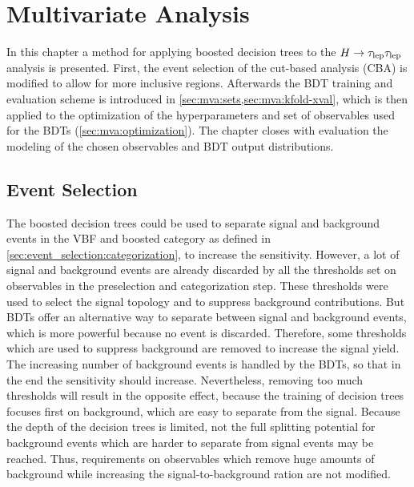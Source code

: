 \chapter{Multivariate Analysis}\label{cha:mva}

In this chapter a method for applying boosted decision trees to the $H \to \tau_\text{lep} \tau_\text{lep}$ analysis is presented.
First, the event selection of the cut-based analysis (CBA) is modified to allow for more inclusive regions.
Afterwards the BDT training and evaluation scheme is introduced in \cref{sec:mva:sets,sec:mva:kfold-xval},
which is then applied to the optimization of the hyperparameters and set of observables used for the BDTs (\cref{sec:mva:optimization}).
The chapter closes with evaluation the modeling of the chosen observables and BDT output distributions.


\section{Event Selection}\label{sec:mva:event_selection}

The boosted decision trees could be used to separate signal and background events in the VBF and boosted category as defined in \cref{sec:event_selection:categorization},
to increase the sensitivity.
However, a lot of signal and background events are already discarded by all the thresholds set on observables in the preselection and categorization step.
These thresholds were used to select the signal topology and to suppress background contributions.
But BDTs offer an alternative way to separate between signal and background events, which is more powerful because no event is
discarded.
Therefore, some thresholds which are used to suppress background are removed to increase the signal yield.
The increasing number of background events is handled by the BDTs, so that in the end the sensitivity should increase.
Nevertheless, removing too much thresholds will result in the opposite effect, because the training of decision trees
focuses first on background, which are easy to separate from the signal.
Because the depth of the decision trees is limited, not the full splitting potential for background events which are harder to separate from signal events may be reached.
Thus, requirements on observables which remove huge amounts of background while increasing the signal-to-background ration are not modified.

